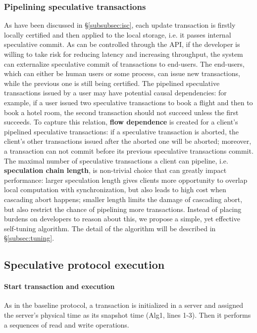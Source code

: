 \subsubsection{Pipelining speculative transactions}
\label{subsec:pipeline}
As have been discussed in \S \ref{subsubsec:isc}, each update transaction is firstly locally certified and then applied to the local storage, i.e. it passes internal speculative commit. As can be controlled through the API, if the developer is willing to take risk for reducing latency and increasing throughput, the system can externalize speculative commit of transactions to end-users. The end-users, which can either be human users or some process, can issue new transactions, while the previous one is still being certified. The pipelined speculative transactions issued by a user may have potential causal dependencies: for example, if a user issued two speculative transactions to book a flight and then to book a hotel room, the second transaction should not succeed unless the first succeeds. To capture this relation, \textbf{flow dependence} is created for a client's pipelined speculative transactions: if a speculative transaction is aborted, the client's other transactions issued after the aborted one will be aborted; moreover, a transaction can not commit before its previous speculative transactions commit. The maximal number of speculative transactions a client can pipeline, i.e. \textbf{speculation chain length}, is non-trivial choice that can greatly impact performance: larger speculation length gives clients more opportunity to overlap local computation with synchronization, but also leads to high cost when cascading abort happens; smaller length limits the damage of cascading abort, but also restrict the chance of pipelining more transactions. Instead of placing burdens on developers to reason about this, we propose a simple, yet effective self-tuning algorithm. The detail of the algorithm will be described in \S \ref{subsec:tuning}.

\subsection{Speculative protocol execution}
\label{subsec:execution}
\paragraph{Start transaction and execution} As in the baseline protocol, a transaction is initialized in a server and assigned the server's physical time as its snapshot time (Alg1, lines 1-3). Then it performs a sequences of read and write operations.

